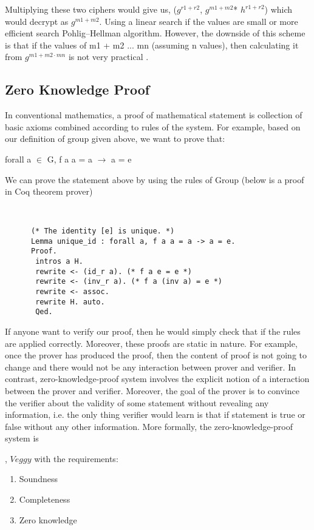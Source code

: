 	      Multiplying these two ciphers would give us,  ($g^{r1 + r2}$, $g^{m1 + m2} $* $ h^{r1 + r2}$) which would decrypt as 
	      $g^{m1 + m2}$. Using a linear search if the values are small or more efficient search Pohlig–Hellman algorithm. However, the downside 
	      of this scheme is that if the values of m1 + m2 ... mn (assuming n values), then calculating it from $g^{m1 + m2 \cdot mn}$ is 
	      not very practical \citep{10.1007/3-540-69053-0_9}. 
	     
     \subsection{Zero Knowledge Proof}
      In conventional mathematics, a proof of mathematical statement is collection of basic axioms combined according to rules of 
      the system. For example, based on our definition of group given above, we want to prove that: 
      
      forall a $\in$ G, f a a = a $\rightarrow$  a = e
      
      We can prove the statement above by using the rules of  Group (below is a proof in Coq theorem prover)
      
      \begin{verbatim}
      
     
      (* The identity [e] is unique. *)
      Lemma unique_id : forall a, f a a = a -> a = e.
      Proof.
       intros a H.
       rewrite <- (id_r a). (* f a e = e *) 
       rewrite <- (inv_r a). (* f a (inv a) = e *)  
       rewrite <- assoc.
       rewrite H. auto.
       Qed.
      \end{verbatim}
     
     If anyone want to verify our proof, then he would simply check that if the rules are applied correctly. Moreover, these proofs 
     are static in nature. For example, once the prover has produced the proof, then the content of proof is not going to change
     and  there would not be any interaction between prover and verifier. 
     In contrast, zero-knowledge-proof system involves the explicit notion of a interaction between the prover and verifier. Moreover, 
     the goal of the prover is to convince the verifier about the validity of some statement without revealing any information, i.e. 
     the only thing verifier would learn is that if statement is true or false without any other information.  More formally, the 
     zero-knowledge-proof system is 
     
     
     , $Veggy$ with the 
     requirements: 
     \begin{enumerate}
     \item Soundness
     \item Completeness
     \item Zero knowledge
     \end{enumerate}
     
